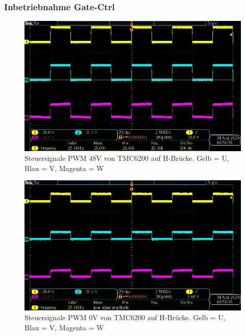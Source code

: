 \subsubsection{Inbetriebnahme Gate-Ctrl}\label{Appendix:TMC6200_Gate_Ctrl}

\begin{figure}[H]
\center
\includegraphics[width = \textwidth]{graphics/TMC6200_Gate_Signal_H}
\caption{Steuersignale PWM 48V von TMC6200 auf H-Brücke. Gelb = U, Blau = V, Magenta = W}
\label{fig:TMC6200_Gate_Signal_H}
\end{figure}

\begin{figure}[H]
\center
\includegraphics[width = \textwidth]{graphics/TMC6200_Gate_Signal_L}
\caption{Steuersignale PWM 0V von TMC6200 auf H-Brücke. Gelb = U, Blau = V, Magenta = W}
\label{fig:TMC6200_Gate_Signal_L}
\end{figure}
